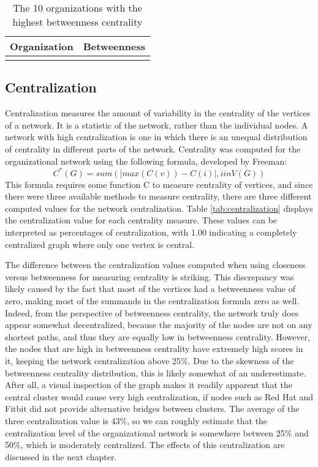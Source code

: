 \begin{table}
	\begin{tabular}{l|c}%
		\bfseries Organization & \bfseries Betweenness%
		\csvreader[head to column names]{betweenness.csv}{}%
		{\\\hline\organizationc & \scorec}%
	\end{tabular}
	\centering
	\caption{The 10 organizations with the highest betweenness centrality}\label{tab:betweenness}
\end{table}

\subsection{Centralization}
Centralization measures the amount of variability in the centrality of the vertices of a network. It is a statistic of the network, rather than the individual nodes. A network with high centralization is one in which there is an unequal distribution of centrality in different parts of the network.  Centrality was computed for the organizational network using the following formula, developed by Freeman\cite{freeman1978centrality}:
\begin{equation*}
C^*(G) = sum( |max(C(v))-C(i)|, i in V(G) )
\end{equation*}
This formula requires some function C to measure centrality of vertices, and since there were three available methods to measure centrality, there are three different computed values for the network centralization. Table \ref{tab:centralization} displays the centralization value for each centrality measure. These values can be interpreted as percentages of centralization, with 1.00 indicating a completely centralized graph where only one vertex is central.

The difference between the centralization values computed when using closeness versus betweenness for measuring centrality is striking. This discrepancy was likely caused by the fact that most of the vertices had a betweenness value of zero, making most of the summands in the centralization formula zero as well. Indeed, from the perspective of betweenness centrality, the network truly does appear somewhat decentralized, because the majority of the nodes are not on any shortest paths, and thus they are equally low in betweenness centrality. However, the nodes that are high in betweenness centrality have extremely high scores in it, keeping the network centralization above 25\%. Due to the skewness of the betweenness centrality distribution, this is likely somewhat of an underestimate. After all, a visual inspection of the graph makes it readily apparent that the central cluster would cause very high centralization, if nodes such as Red Hat and Fitbit did not provide alternative bridges between clusters. The average of the three centralization value is 43\%, so we can roughly estimate that the centralization level of the organizational network is somewhere between 25\% and 50\%, which is moderately centralized. The effects of this centralization are discussed in the next chapter.

